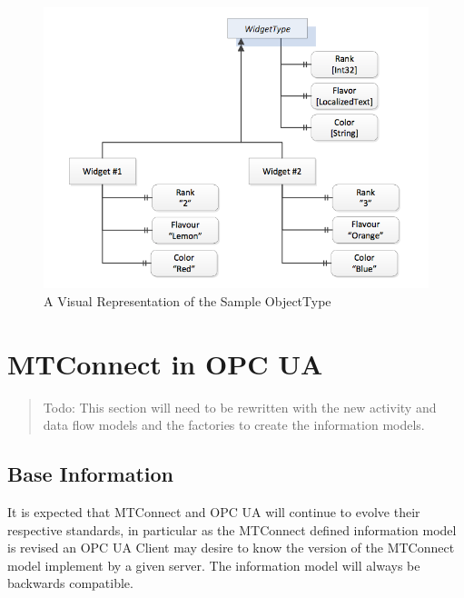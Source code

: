 \documentclass{mtconnect}	%
\begin{document}
\begin{figure}[h]
  \centering
  \includegraphics[width=1.0\textwidth]{diagrams/SampleObjectType.png}
  \caption{A Visual Representation of the Sample ObjectType}
  \label{fig:sample_object_type}
\end{figure}

\FloatBarrier
\section{MTConnect in OPC UA}

\begin{quote}
    \color{red}
    Todo: This section will need to be rewritten with the new activity and data flow models and the factories to create the information models.
\end{quote}

\subsection{Base Information}

It is expected that MTConnect and OPC UA will continue to evolve their respective standards, in particular as the MTConnect defined information model is revised an OPC UA Client may desire to know the version of the MTConnect model implement by a given server. The information model will always be backwards compatible.
\end{document}
